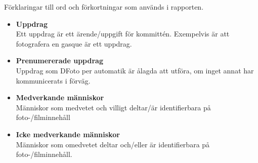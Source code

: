 Förklaringar till ord och förkortningar som används i rapporten.

\begin{itemize}
    \item \textbf{Uppdrag} \\
    Ett uppdrag är ett ärende/uppgift för kommittén. Exempelvis är att fotografera en gasque är ett uppdrag. 
    \item \textbf{Prenumererade uppdrag} \\
    Uppdrag som DFoto per automatik är ålagda att utföra, om inget annat har kommunicerats i förväg. 
    \item \textbf{Medverkande människor} \\
    Människor som medvetet och villigt deltar/är identifierbara på foto-/filminnehåll
    \item \textbf{Icke medverkande människor} \\
    Människor som omedvetet deltar och/eller är identifierbara på foto-/filminnehåll. 

\end{itemize}